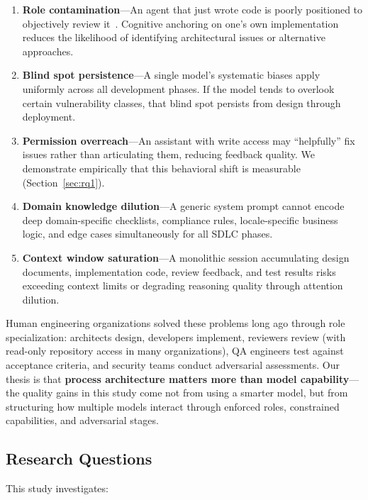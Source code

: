 \documentclass[a4paper,USenglish,cleveref,autoref]{lipics-v2021}
\begin{document}
\begin{enumerate}
    \item \textbf{Role contamination}---An agent that just wrote code is poorly positioned to objectively review it~\cite{beller2014}. Cognitive anchoring on one's own implementation reduces the likelihood of identifying architectural issues or alternative approaches.
    \item \textbf{Blind spot persistence}---A single model's systematic biases apply uniformly across all development phases. If the model tends to overlook certain vulnerability classes, that blind spot persists from design through deployment.
    \item \textbf{Permission overreach}---An assistant with write access may ``helpfully'' fix issues rather than articulating them, reducing feedback quality. We demonstrate empirically that this behavioral shift is measurable (Section~\ref{sec:rq1}).
    \item \textbf{Domain knowledge dilution}---A generic system prompt cannot encode deep domain-specific checklists, compliance rules, locale-specific business logic, and edge cases simultaneously for all SDLC phases.
    \item \textbf{Context window saturation}---A monolithic session accumulating design documents, implementation code, review feedback, and test results risks exceeding context limits or degrading reasoning quality through attention dilution.
\end{enumerate}

Human engineering organizations solved these problems long ago through role specialization: architects design, developers implement, reviewers review (with read-only repository access in many organizations), QA engineers test against acceptance criteria, and security teams conduct adversarial assessments. Our thesis is that \textbf{process architecture matters more than model capability}---the quality gains in this study come not from using a smarter model, but from structuring how multiple models interact through enforced roles, constrained capabilities, and adversarial stages.

\subsection{Research Questions}

This study investigates:
\end{document}
